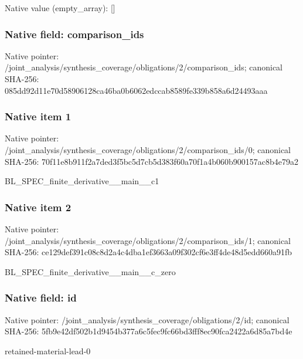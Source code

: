 \documentclass[10pt,a4paper]{article}
\begin{document}
Native value (empty\_\allowbreak{}array): []

\subsubsection{Native field: comparison\_\allowbreak{}ids}
Native pointer: /joint\_\allowbreak{}analysis/synthesis\_\allowbreak{}coverage/obligations/2/comparison\_\allowbreak{}ids; canonical SHA-256: 085dd92d11e70d58906128ca46ba0b6062edccab8589fe339b858a6d24493aaa

\subsubsection{Native item 1}
Native pointer: /joint\_\allowbreak{}analysis/synthesis\_\allowbreak{}coverage/obligations/2/comparison\_\allowbreak{}ids/0; canonical SHA-256: 70f11e8b911f2a7ded3f5bc5d7cb5d383f60a70f1a4b060b900157ac8b4e79a2

\begingroup\raggedright\sloppy BL\_\allowbreak{}SPEC\_\allowbreak{}finite\_\allowbreak{}derivative\_\allowbreak{}\_\allowbreak{}main\_\allowbreak{}\_\allowbreak{}c1\par\endgroup

\subsubsection{Native item 2}
Native pointer: /joint\_\allowbreak{}analysis/synthesis\_\allowbreak{}coverage/obligations/2/comparison\_\allowbreak{}ids/1; canonical SHA-256: ce129def391c08c8d2a4c4dba1ef3663a09f302cf6e3ff4de48d5edd660a91fb

\begingroup\raggedright\sloppy BL\_\allowbreak{}SPEC\_\allowbreak{}finite\_\allowbreak{}derivative\_\allowbreak{}\_\allowbreak{}main\_\allowbreak{}\_\allowbreak{}c\_\allowbreak{}zero\par\endgroup

\subsubsection{Native field: id}
Native pointer: /joint\_\allowbreak{}analysis/synthesis\_\allowbreak{}coverage/obligations/2/id; canonical SHA-256: 5fb9e42df502b1d9454b377a6c5fec9fc66bd3fff8ec90fca2422a6d85a7bd4e

\begingroup\raggedright\sloppy retained-material-lead-0\par\endgroup
\end{document}
